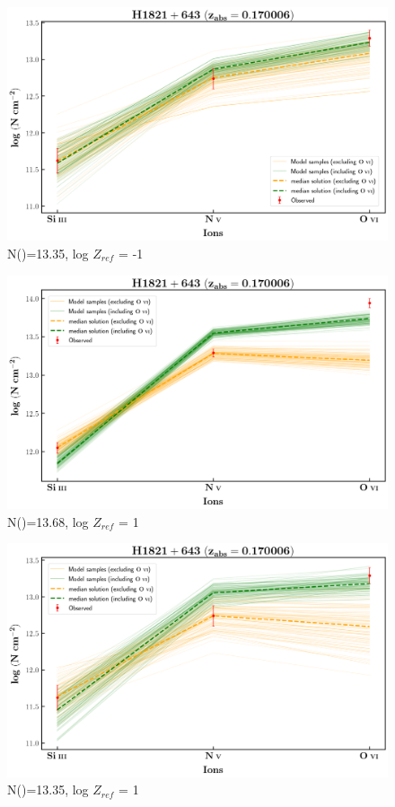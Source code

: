 \documentclass[12pt,draft]{report}
\newcommand\ion[2]{\text{#1\,\textsc{\lowercase{#2}}}}
\begin{document}
\begin{figure}[!b]
    \centering
    \includegraphics[width=0.85\linewidth]{Ionisation-Modelling-Plots/h1821-z=0.170006-compIII_logZ=-1.png}
    \caption{N(\ion{H}{i})=13.35, log $Z_{ref}$ = -1}
\end{figure}


\newpage

\begin{figure}[!h]
    \centering
    \includegraphics[width=0.85\linewidth]{Ionisation-Modelling-Plots/h1821-z=0.170006-compII.png}
    \caption{N(\ion{H}{i})=13.68, log $Z_{ref}$ = 1}
\end{figure}

\begin{figure}[!b]
    \centering
    \includegraphics[width=0.85\linewidth]{Ionisation-Modelling-Plots/h1821-z=0.170006-compIII.png}
    \caption{N(\ion{H}{i})=13.35, log $Z_{ref}$ = 1}
\end{figure}
\end{document}
